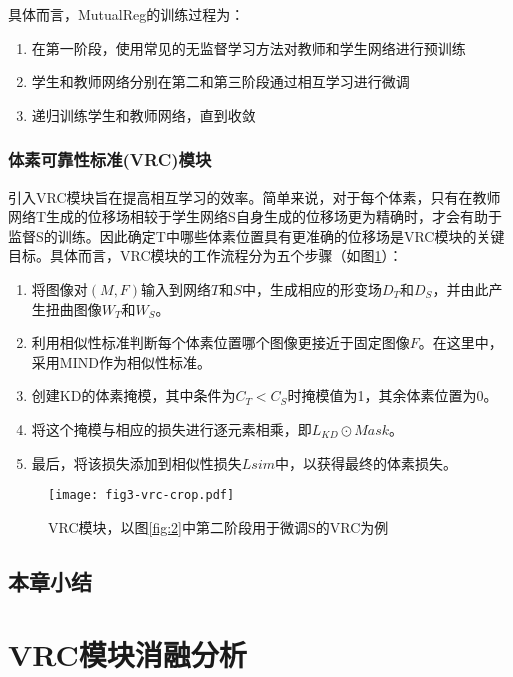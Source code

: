 具体而言，MutualReg的训练过程为：

\begin{enumerate}
    \item 在第一阶段，使用常见的无监督学习方法对教师和学生网络进行预训练
    \item 学生和教师网络分别在第二和第三阶段通过相互学习进行微调
    \item 递归训练学生和教师网络，直到收敛
\end{enumerate}


\subsection{体素可靠性标准(VRC)模块}

引入VRC模块旨在提高相互学习的效率。简单来说，对于每个体素，只有在教师网络T生成的位移场相较于学生网络S自身生成的位移场更为精确时，才会有助于监督S的训练。因此确定T中哪些体素位置具有更准确的位移场是VRC模块的关键目标。具体而言，VRC模块的工作流程分为五个步骤（如图\ref{fig:3}）：

\begin{enumerate}
    \item 将图像对$(M,F)$输入到网络$T$和$S$中，生成相应的形变场$D_T$和$D_S$，并由此产生扭曲图像$W_T$和$W_S$。
    \item 利用相似性标准判断每个体素位置哪个图像更接近于固定图像$F$。在这里中，采用MIND作为相似性标准。
    \item 创建KD的体素掩模，其中条件为$C_T<C_S$时掩模值为1，其余体素位置为0。
    \item 将这个掩模与相应的损失进行逐元素相乘，即$L_{KD} \odot Mask$。
    \item 最后，将该损失添加到相似性损失$L{sim}$中，以获得最终的体素损失。
\end{enumerate}

\begin{figure}[h]
    \centering
    \texttt{[image: fig3-vrc-crop.pdf]}
    \caption{VRC模块，以图\ref{fig:2}中第二阶段用于微调S的VRC为例}
    \label{fig:3}
\end{figure}

\section{本章小结}

\chapter{VRC模块消融分析}

